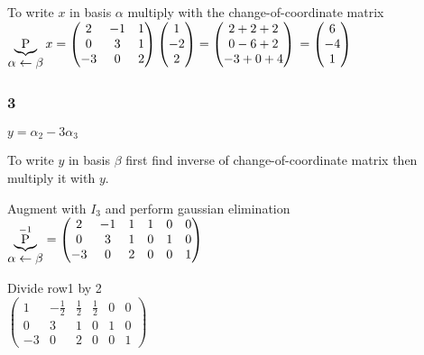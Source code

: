 \documentclass{article}
\begin{document}
To write $x$ in basis $\alpha$ multiply with the change-of-coordinate matrix\\
$\underbrace{\hbox{P}}_{\hbox{$\alpha \leftarrow \beta$}}x = 
\left (
    \begin{matrix}
        2 & -1 & 1\\
        0 & 3 & 1\\
        -3 & 0 & 2
    \end{matrix}
\right )
\left (
    \begin{matrix}
        1\\
        -2\\
        2
    \end{matrix}
\right )
=
\left (
    \begin{matrix}
        2 + 2 + 2\\
        0 - 6 + 2\\
        -3 + 0 + 4
    \end{matrix}
\right ) \\
=
\left (
    \begin{matrix}
        6\\
        -4\\
        1
    \end{matrix}
\right )
$

\subsubsection*{3}
$y = \alpha_{2}-3\alpha_{3}$

To write $y$ in basis $\beta$ first find inverse of change-of-coordinate matrix then multiply it with $y$.

Augment with $I_{3}$ and perform gaussian elimination
$\underbrace{\hbox{P}}_{\hbox{$\alpha \leftarrow \beta$}}^{-1} =
\left (
    \begin{matrix}
        2 & -1 & 1 & 1 & 0 & 0\\
        0 & 3 & 1 & 0 & 1 & 0\\
        -3 & 0 & 2 & 0 & 0 & 1
    \end{matrix}
\right )
$

Divide row1 by 2\\
$
\left (
    \begin{matrix}
        1 & -\frac{1}{2} & \frac{1}{2} & \frac{1}{2} & 0 & 0\\
        0 & 3 & 1 & 0 & 1 & 0\\
        -3 & 0 & 2 & 0 & 0 & 1
    \end{matrix}
\right )
$
\end{document}

